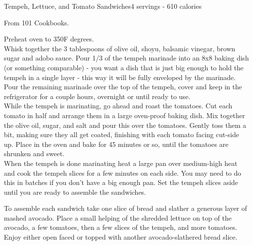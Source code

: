 \begin{recipe}{Tempeh, Lettuce, and Tomato Sandwiches}{4 servings - 610 calories}{}

\freeform From 101 Cookbooks.


Preheat oven to 350F degrees.\\

Whisk together the 3 tablespoons of olive oil, shoyu, balsamic vinegar, brown sugar and adobo sauce. Pour 1/3 of the tempeh marinade into an 8x8 baking dish (or something comparable) - you want a dish that is just big enough to hold the tempeh in a single layer - this way it will be fully enveloped by the marinade. Pour the remaining marinade over the top of the tempeh, cover and keep in the refrigerator for a couple hours, overnight or until ready to use.\\

While the tempeh is marinating, go ahead and roast the tomatoes. Cut each tomato in half and arrange them in a large oven-proof baking dish. Mix together the olive oil, sugar, and salt and pour this over the tomatoes. Gently toss them a bit, making sure they all get coated, finishing with each tomato facing cut-side up. Place in the oven and bake for 45 minutes or so, until the tomatoes are shrunken and sweet.\\

When the tempeh is done marinating heat a large pan over medium-high heat and cook the tempeh slices for a few minutes on each side. You may need to do this in batches if you don't have a big enough pan. Set the tempeh slices aside until you are ready to assemble the sandwiches.\newpage

To assemble each sandwich take one slice of bread and slather a generous layer of mashed avocado. Place a small helping of the shredded lettuce on top of the avocado, a few tomatoes, then a few slices of the tempeh, and more tomatoes. Enjoy either open faced or topped with another avocado-slathered bread slice.

\end{recipe}